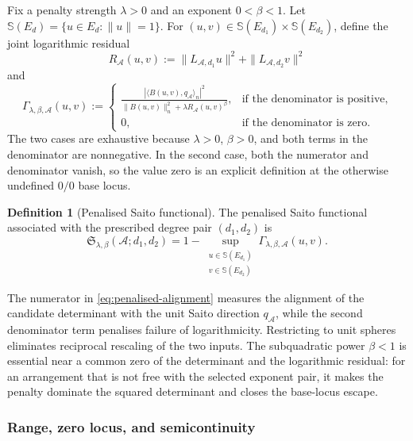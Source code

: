 \documentclass[pdflatex,sn-mathphys-num]{sn-jnl}%
\theoremstyle{remark}
\theoremstyle{definition}
\newtheorem{definition}{Definition}
\begin{document}
Fix a penalty strength $\lambda>0$ and an exponent $0<\beta<1$. Let $\mathbb S(E_d)=\{u\in E_d:\|u\|=1\}$. For
$(u,v)\in\mathbb S(E_{d_1})\times\mathbb S(E_{d_2})$, define the joint
logarithmic residual
\begin{equation}
\label{eq:joint-residual}
R_{\mathcal{A}}(u,v)
:=\|L_{\mathcal{A},d_1}u\|^2
+\|L_{\mathcal{A},d_2}v\|^2
\end{equation}
and
\begin{equation}
\label{eq:penalised-alignment}
\Gamma_{\lambda,\beta,\mathcal{A}}(u,v)
:=
\begin{cases}
\displaystyle
\frac{|\langle B(u,v),q_{\mathcal{A}}\rangle_n|^2}
{\|B(u,v)\|_n^2+\lambda R_{\mathcal{A}}(u,v)^\beta},
&\text{if the denominator is positive},\\[1.2em]
0,&\text{if the denominator is zero}.
\end{cases}
\end{equation}
The two cases are exhaustive because $\lambda>0$, $\beta>0$, and both terms in the denominator are nonnegative. In the second case, both the numerator and denominator vanish, so the value zero is an explicit definition at the otherwise undefined $0/0$ base locus.

\begin{definition}[Penalised Saito functional]
\label{def:saito-functional}
The penalised Saito functional associated with the prescribed degree pair
$(d_1,d_2)$ is
\begin{equation}
\label{eq:saito-loss}
\mathfrak S_{\lambda,\beta}(\mathcal{A};d_1,d_2)
=1-
\sup_{\substack{u\in\mathbb S(E_{d_1})\\
 v\in\mathbb S(E_{d_2})}}
\Gamma_{\lambda,\beta,\mathcal{A}}(u,v).
\end{equation}
\end{definition}

The numerator in \eqref{eq:penalised-alignment} measures the alignment of the candidate determinant with the unit Saito direction $q_{\mathcal{A}}$, while the second denominator term penalises failure of logarithmicity. Restricting to unit spheres eliminates reciprocal rescaling of the two inputs. The subquadratic power $\beta<1$ is essential near a common zero of the determinant and the logarithmic residual: for an arrangement that is not free with the selected exponent pair, it makes the penalty dominate the squared determinant and closes the base-locus escape.

\subsubsection{Range, zero locus, and semicontinuity}
\end{document}
